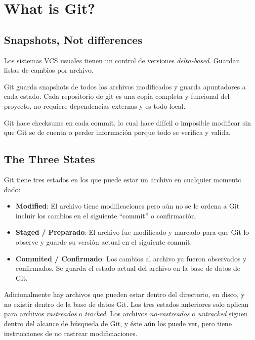 \documentclass[spanish, 12pt, a4paper]{article}
\begin{document}
\section{What is Git?}

\subsection{Snapshots, Not differences}

Los sistemas VCS usuales tienen un control de versiones
\emph{delta-based}. Guardan listas de cambios por archivo.

Git guarda snapshots de todos los archivos modificados y guarda
apuntadores a cada estado. Cada repositorio de git es una copia completa
y funcional del proyecto, no requiere dependencias externas y es todo
local.

Git hace checksums en cada commit, lo cual hace difícil o imposible
modificar sin que Git se de cuenta o perder información porque todo se
verifica y valida.

\subsection{The Three States}

Git tiene tres estados en los que puede estar un archivo en cualquier
momento dado:

\begin{itemize}
\item
  \textbf{Modified}: El archivo tiene modificaciones pero
  aún no se le ordena a Git incluir los cambios en el siguiente ``commit''
  o confirmación.
\item
  \textbf{Staged / Preparado}: El archivo fue modificado y marcado para
  que Git lo observe y guarde su versión actual en el siguiente commit.
\item
  \textbf{Commited / Confirmado}: Los cambios al archivo ya fueron
  observados y confirmados. Se guarda el estado actual del archivo en la
  base de datos de Git.
\end{itemize}

Adicionalmente hay archivos que pueden estar dentro del directorio, en
disco, y no existir dentro de la base de datos Git. Los tres estados
anteriores solo aplican para archivos \emph{rastreados} o
\emph{tracked}. Los archivos \emph{no-rastreados} o \emph{untracked}
siguen dentro del alcance de búsqueda de Git, y éste aún los puede ver,
pero tiene instrucciones de no rastrear modificiaciones.
\end{document}
